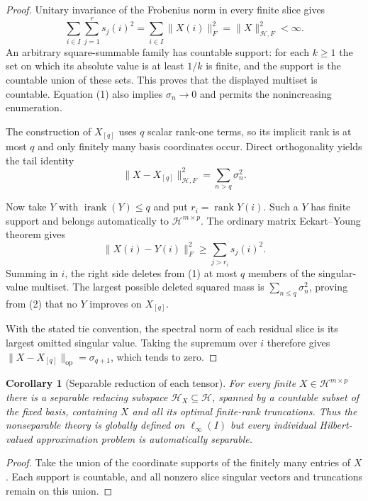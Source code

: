 \documentclass[11pt]{article}
\newtheorem{corollary}[theorem]{Corollary}
\newcommand{\Hh}{\mathcal H}
\newcommand{\rank}{\operatorname{rank}}
\newcommand{\irank}{\operatorname{irank}}
\begin{document}
\begin{proof}
Unitary invariance of the Frobenius norm in every finite slice gives
\[
 \sum_{i\in I}\sum_{j=1}^r s_j(i)^2
 =\sum_{i\in I}\|X(i)\|_F^2
 =\|X\|_{\Hh,F}^2<\infty.                                      \tag{1}
\]
An arbitrary square-summable family has countable support: for each $k\ge1$
the set on which its absolute value is at least $1/k$ is finite, and the
support is the countable union of these sets.  This proves that the displayed
multiset is countable.  Equation (1) also implies $\sigma_n\to0$ and permits
the nonincreasing enumeration.

The construction of $X_{[q]}$ uses $q$ scalar rank-one terms, so its implicit
rank is at most $q$ and only finitely many basis coordinates occur.  Direct
orthogonality yields the tail identity
\[
 \|X-X_{[q]}\|_{\Hh,F}^2=\sum_{n>q}\sigma_n^2.                 \tag{2}
\]

Now take $Y$ with $\irank(Y)\le q$ and put $r_i=\rank Y(i)$.  Such a $Y$ has
finite support and belongs automatically to $\Hh^{m\times p}$.  The ordinary
matrix Eckart--Young theorem gives
\[
 \|X(i)-Y(i)\|_F^2\ge\sum_{j>r_i}s_j(i)^2.
\]
Summing in $i$, the right side deletes from (1) at most $q$ members of the
singular-value multiset.  The largest possible deleted squared mass is
$\sum_{n\le q}\sigma_n^2$, proving from (2) that no $Y$ improves on
$X_{[q]}$.

With the stated tie convention, the spectral norm of each residual slice is
its largest omitted singular value.  Taking the supremum over $i$ therefore
gives $\|X-X_{[q]}\|_{\mathrm{op}}=\sigma_{q+1}$, which tends to zero.
\end{proof}

\begin{corollary}[Separable reduction of each tensor]
For every finite $X\in\Hh^{m\times p}$ there is a separable reducing
subspace $\Hh_X\subseteq\Hh$, spanned by a countable subset of the fixed
basis, containing $X$ and all its optimal finite-rank truncations.  Thus the
nonseparable theory is globally defined on $\ell_\infty(I)$ but every
individual Hilbert-valued approximation problem is automatically separable.
\end{corollary}

\begin{proof}
Take the union of the coordinate supports of the finitely many entries of
$X$.  Each support is countable, and all nonzero slice singular vectors and
truncations remain on this union.
\end{proof}
\end{document}
